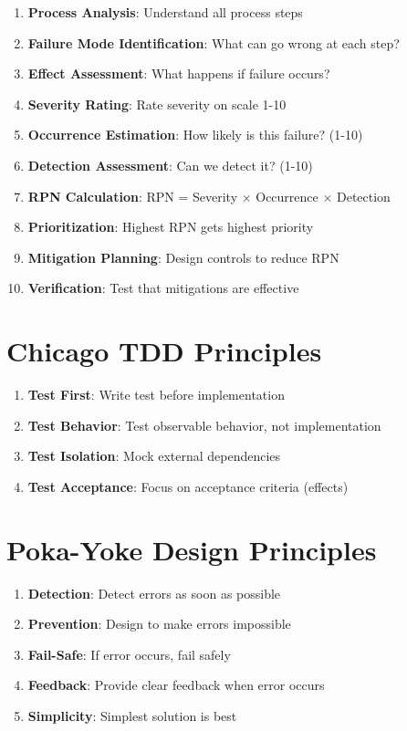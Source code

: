 \documentclass[12pt,twoside,openright]{book}
\theoremstyle{plain}
\theoremstyle{definition}
\theoremstyle{remark}
\begin{document}
\begin{appendices}
\begin{enumerate}
  \item \textbf{Process Analysis}: Understand all process steps
  \item \textbf{Failure Mode Identification}: What can go wrong at each step?
  \item \textbf{Effect Assessment}: What happens if failure occurs?
  \item \textbf{Severity Rating}: Rate severity on scale 1-10
  \item \textbf{Occurrence Estimation}: How likely is this failure? (1-10)
  \item \textbf{Detection Assessment}: Can we detect it? (1-10)
  \item \textbf{RPN Calculation}: RPN = Severity × Occurrence × Detection
  \item \textbf{Prioritization}: Highest RPN gets highest priority
  \item \textbf{Mitigation Planning}: Design controls to reduce RPN
  \item \textbf{Verification}: Test that mitigations are effective
\end{enumerate}

\section{Chicago TDD Principles}

\begin{enumerate}
  \item \textbf{Test First}: Write test before implementation
  \item \textbf{Test Behavior}: Test observable behavior, not implementation
  \item \textbf{Test Isolation}: Mock external dependencies
  \item \textbf{Test Acceptance}: Focus on acceptance criteria (effects)
\end{enumerate}

\section{Poka-Yoke Design Principles}

\begin{enumerate}
  \item \textbf{Detection}: Detect errors as soon as possible
  \item \textbf{Prevention}: Design to make errors impossible
  \item \textbf{Fail-Safe}: If error occurs, fail safely
  \item \textbf{Feedback}: Provide clear feedback when error occurs
  \item \textbf{Simplicity}: Simplest solution is best
\end{enumerate}


\end{appendices}
\end{document}
